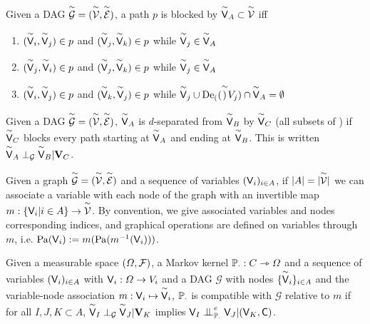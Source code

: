 \begin{definition}
Given a DAG $\overset{\sim}{\mathcal{G}}=(\overset{\sim}{\mathcal{V}},\overset{\sim}{\mathcal{E}})$, a path $p$ is blocked by $\overset{\sim}{\mathsf{V}}_A\subset\overset{\sim}{\mathcal{V}}$ iff
\begin{enumerate}
    \item $(\overset{\sim}{\mathsf{V}}_i,\overset{\sim}{\mathsf{V}}_j)\in p$ and $(\overset{\sim}{\mathsf{V}}_j,\overset{\sim}{\mathsf{V}}_k)\in p$ while $\overset{\sim}{\mathsf{V}}_j\in \overset{\sim}{\mathsf{V}}_A$
    \item $(\overset{\sim}{\mathsf{V}}_j,\overset{\sim}{\mathsf{V}}_i)\in p$ and $(\overset{\sim}{\mathsf{V}}_j,\overset{\sim}{\mathsf{V}}_k)\in p$ while $\overset{\sim}{\mathsf{V}}_j\in \overset{\sim}{\mathsf{V}}_A$
    \item $(\overset{\sim}{\mathsf{V}}_i,\overset{\sim}{\mathsf{V}}_j)\in p$ and $(\overset{\sim}{\mathsf{V}}_k,\overset{\sim}{\mathsf{V}}_j)\in p$ while $\overset{\sim}{\mathsf{V}}_j\cup \text{De}_{(}(\overset{\sim}{\mathsf{)}}{V}_j)\cap \overset{\sim}{\mathsf{V}}_A=\emptyset$
\end{enumerate}
\end{definition}

\begin{definition}[d-separation]
Given a DAG $\overset{\sim}{\mathcal{G}}=(\overset{\sim}{\mathcal{V}},\overset{\sim}{\mathcal{E}})$, $\overset{\sim}{\mathsf{V}}_A$ is $d$-separated from $\overset{\sim}{\mathsf{V}}_B$ by $\overset{\sim}{\mathsf{V}}_C$ (all subsets of ) if $\overset{\sim}{\mathsf{V}}_C$ blocks every path starting at $\overset{\sim}{\mathsf{V}}_A$ and ending at $\overset{\sim}{\mathsf{V}}_B$. This is written $\overset{\sim}{\mathsf{V}}_A\perp_{\mathcal{G}} \overset{\sim}{\mathsf{V}}_B | \mathbf{V}_C$.
\end{definition}

\begin{definition}
Given a graph $\overset{\sim}{\mathcal{G}}=(\overset{\sim}{\mathcal{V}},\overset{\sim}{\mathcal{E}})$ and a sequence of variables $(\mathsf{V}_i)_{i\in A}$, if $|A|=|\overset{\sim}{\mathcal{V}}|$ we can associate a variable with each node of the graph with an invertible map $m:\{\mathsf{V}_i|i\in A\}\to \overset{\sim}{\mathcal{V}}$. By convention, we give associated variables and nodes corresponding indices, and graphical operations are defined on variables through $m$, i.e. $\mathrm{Pa}(\mathsf{V}_i):=m(\mathrm{Pa}(m^{-1}(\mathsf{V}_i)))$.
\end{definition}

\begin{definition}[Compatibility]\label{def:compat}
Given a measurable space $(\Omega,\mathcal{F})$, a Markov kernel $\mathbb{P}_\cdot:C\rightarrowtriangle \Omega$ and a sequence of variables $(\mathsf{V}_i)_{i\in A}$ with $\mathsf{V}_i:\Omega\to V_i$ and a DAG $\mathcal{G}$ with nodes $\{\overset{\sim}{\mathsf{V}}_i\}_{i\in A}$ and the variable-node association $m:\mathsf{V}_i\mapsto \overset{\sim}{\mathsf{V}}_i$, $\mathbb{P}_\cdot$ is compatible with $\mathcal{G}$ relative to $m$ if for all $I,J,K\subset A$, $\overset{\sim}{\mathsf{V}}_I\perp_{\mathcal{G}} \overset{\sim}{\mathsf{V}}_J | \mathbf{V}_K$ implies $\RV{V}_I\CI^e_{\prob{P}_\cdot} \RV{V}_J | (\RV{V}_K,\RV{C})$.
\end{definition}

